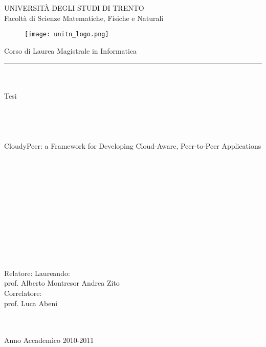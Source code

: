 \documentclass [11pt, a4paper]{report}
\begin{document}


\begin{titlepage}
\begin{center}
\LARGE
UNIVERSIT\`A DEGLI STUDI DI TRENTO\\
\large
Facolt\`a di Scienze Matematiche, Fisiche e Naturali\\
\begin{figure}[htbp]
\centering
\texttt{[image: unitn\_logo.png]}
\end{figure}
\large
Corso di Laurea Magistrale in Informatica\\
\rule{\linewidth}{0.5mm}
\ \\ \ \\
Tesi\\
\ \\ \ \\ \ \\ \ \\
\Large
CloudyPeer: a Framework for Developing Cloud-Aware, Peer-to-Peer
Applications
\end{center}

\ \\ \ \\ \ \\ \ \\ \ \\ \ \\ \ \\ \ \\ \ \\ \ \\ \ \\
\large
\flushleft \large Relatore:  \large Laureando:\\
\large prof. Alberto Montresor    \large Andrea Zito\\
\flushleft \large Correlatore:\\
\large prof. Luca Abeni
\normalsize
\ \\ \ \\ \ \\
\begin{center}
 Anno Accademico 2010-2011
\end{center}
\end{titlepage}

{
  \baselineskip=13pt
  \tableofcontents
}







{}

\end{document}
